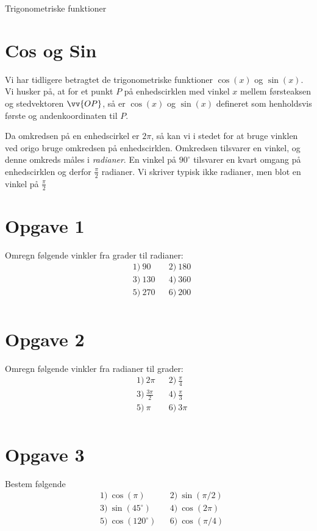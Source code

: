 \begin{center}
\Huge
Trigonometriske funktioner
\end{center}

\section*{Cos og Sin}

Vi har tidligere betragtet de trigonometriske funktioner $\cos(x)$ og $\sin(x)$. Vi husker på, at for et punkt $P$ på enhedscirklen med vinkel $x$ mellem førsteaksen og stedvektoren $\vv{OP}$, så er $\cos(x)$ og $\sin(x)$ defineret som henholdsvis første og andenkoordinaten til $P$. 

Da omkredsen på en enhedscirkel er $2\pi$, så kan vi i stedet for at bruge vinklen ved origo bruge omkredsen på enhedscirklen. Omkredsen tilsvarer en vinkel, og denne omkreds måles i \textit{radianer}. En vinkel på $90^\circ$ tilsvarer en kvart omgang på enhedscirklen og derfor $\frac{\pi}{2}$ radianer. Vi skriver typisk ikke radianer, men blot en vinkel på $\frac{\pi}{2}$
\section*{Opgave 1}
Omregn følgende vinkler fra grader til radianer:
\begin{align*}
&1) \  90   &&2) \  180 \\
&3) \  130   &&4) \ 360  \\
&5) \  270   &&6) \ 200  \\  
\end{align*} 

\section*{Opgave 2}
Omregn følgende vinkler fra radianer til grader:
\begin{align*}
&1) \  2\pi  &&2) \  \frac{\pi}{4}    \\
&3) \  \frac{3\pi}{2}  &&4) \  \frac{\pi}{3}    \\
&5) \  \pi  &&6) \  3\pi   \\
\end{align*}

\section*{Opgave 3}
Bestem følgende 
\begin{align*}
&1) \ \cos(\pi)    &&2) \ \sin(\pi/2)    \\
&3) \ \sin(45^\circ)    &&4) \ \cos(2\pi)    \\
&5) \ \cos(120^\circ)    &&6) \  \cos(\pi/4)   \\
\end{align*}